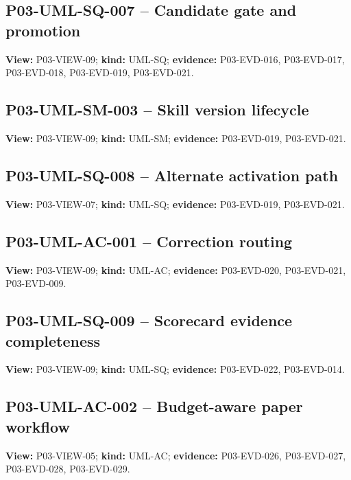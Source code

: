 \documentclass[10pt,letterpaper]{article}
\begin{document}
\subsection{P03-UML-SQ-007 -- Candidate gate and promotion}
\textbf{View:} P03-VIEW-09; \textbf{kind:} UML-SQ; \textbf{evidence:} P03-EVD-016, P03-EVD-017, P03-EVD-018, P03-EVD-019, P03-EVD-021.\par
{}
\clearpage

\subsection{P03-UML-SM-003 -- Skill version lifecycle}
\textbf{View:} P03-VIEW-09; \textbf{kind:} UML-SM; \textbf{evidence:} P03-EVD-019, P03-EVD-021.\par
{}
\clearpage

\subsection{P03-UML-SQ-008 -- Alternate activation path}
\textbf{View:} P03-VIEW-07; \textbf{kind:} UML-SQ; \textbf{evidence:} P03-EVD-019, P03-EVD-021.\par
{}
\clearpage

\subsection{P03-UML-AC-001 -- Correction routing}
\textbf{View:} P03-VIEW-09; \textbf{kind:} UML-AC; \textbf{evidence:} P03-EVD-020, P03-EVD-021, P03-EVD-009.\par
{}
\clearpage

\subsection{P03-UML-SQ-009 -- Scorecard evidence completeness}
\textbf{View:} P03-VIEW-09; \textbf{kind:} UML-SQ; \textbf{evidence:} P03-EVD-022, P03-EVD-014.\par
{}
\clearpage

\subsection{P03-UML-AC-002 -- Budget-aware paper workflow}
\textbf{View:} P03-VIEW-05; \textbf{kind:} UML-AC; \textbf{evidence:} P03-EVD-026, P03-EVD-027, P03-EVD-028, P03-EVD-029.\par
{}
\clearpage
\end{document}
